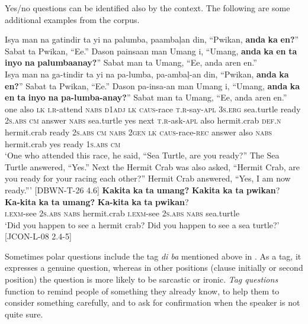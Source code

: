Yes/no questions can be identified also by the context. The following are some additional examples from the corpus.

\ea
Isya  man  na  gatindir  ta  yi  na  palumba,  paambaļan  din, “Pwikan,  \textbf{anda}  \textbf{ka}  \textbf{en?}”  Sabat  ta  Pwikan,  “Ee.”  Dason  painsaan man  Umang  i,  “Umang,  \textbf{anda}  \textbf{ka}  \textbf{en}  \textbf{ta}  \textbf{inyo}  \textbf{na} \textbf{palumbaanay?}”  Sabat  man  ta  Umang,  “Ee,  anda  aren  en.” \\\smallskip
\gll Isya  man  na  ga-tindir  ta  yi  na  pa-lumba,  pa-ambaļ-an  din, “Pwikan,  \textbf{anda}  \textbf{ka}  \textbf{en?}”  Sabat  ta  Pwikan,  “Ee.”  Dason  pa-insa-an man  Umang  i,  “Umang,  \textbf{anda}  \textbf{ka}  \textbf{en}  \textbf{ta}  \textbf{inyo}  \textbf{na} \textbf{pa-lumba-anay?}”  Sabat  man  ta  Umang,  “Ee,  anda  aren  en.” \\
one  also  \textsc{lk}  \textsc{i.r}-attend  \textsc{nabs}  \textsc{d}1\textsc{adj}  \textsc{lk}  \textsc{caus}-race  \textsc{t.r}-say-\textsc{apl}  3\textsc{s.erg}
sea.turtle  ready  2\textsc{s.abs}  \textsc{cm}  answer  \textsc{nabs}  sea.turtle  yes  next  \textsc{t.r}-ask-\textsc{apl}
also  hermit.crab  \textsc{def.n}  hermit.crab  ready 2\textsc{s.abs}  \textsc{cm}  \textsc{nabs}  2\textsc{gen}  \textsc{lk}
\textsc{caus}-race-\textsc{rec}  answer  also  \textsc{nabs}  hermit.crab  yes  ready  1\textsc{s.abs}  \textsc{cm} \\
\glt `One who attended this race, he said, “Sea Turtle, are you ready?” The Sea Turtle answered, “Yes.” Next the Hermit Crab was also asked, “Hermit Crab, are you ready for  your racing each other?” Hermit Crab answered, “Yes, I am now ready.”' [DBWN-T-26 4.6]
\z
\ea
\textbf{Kakita}  \textbf{ka}  \textbf{ta}  \textbf{umang?}  \textbf{Kakita}  \textbf{ka}  \textbf{ta}  \textbf{pwikan}? \\\smallskip
\gll \textbf{Ka-kita}  \textbf{ka}  \textbf{ta}  \textbf{umang?}  \textbf{Ka-kita}  \textbf{ka}  \textbf{ta}  \textbf{pwikan}? \\
\textsc{i.exm}-see  2\textsc{s.abs}  \textsc{nabs}  hermit.crab  \textsc{i.exm}-see  2\textsc{s.abs}  \textsc{nabs}  sea.turtle \\
\glt ‘Did you happen to see a hermit crab? Did you happen to see a  sea turtle?' [JCON-L-08 2.4-5]
\z

Sometimes polar questions include the tag \textit{di ba} mentioned above in . As a tag, it expresses a genuine question, whereas in other positions (clause initially or second position) the question is more likely to be sarcastic or ironic. \textit{Tag questions} function to remind people of something they already know, to help them to consider something carefully, and to ask for confirmation when the speaker is not quite sure.

